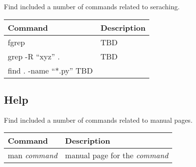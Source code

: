 Find included a number of commands related to seraching.

\begin{longtable}[]{@{}ll@{}}
\toprule
\begin{minipage}[b]{0.46\columnwidth}\raggedright\strut
Command\strut
\end{minipage} & \begin{minipage}[b]{0.21\columnwidth}\raggedright\strut
Description\strut
\end{minipage}\tabularnewline
\midrule
\endhead
\begin{minipage}[t]{0.46\columnwidth}\raggedright\strut
fgrep\strut
\end{minipage} & \begin{minipage}[t]{0.21\columnwidth}\raggedright\strut
TBD\strut
\end{minipage}\tabularnewline
\begin{minipage}[t]{0.46\columnwidth}\raggedright\strut
grep -R ``xyz'' .\strut
\end{minipage} & \begin{minipage}[t]{0.21\columnwidth}\raggedright\strut
TBD\strut
\end{minipage}\tabularnewline
\begin{minipage}[t]{0.48\columnwidth}\raggedright\strut
find . -name ``*.py'' \textbar{} TBD \textbar{}\strut
\end{minipage} & \begin{minipage}[t]{0.48\columnwidth}\raggedright\strut
\strut
\end{minipage}\tabularnewline
\bottomrule
\end{longtable}

\subsection{Help}\label{help}

Find included a number of commands related to manual pages.

\begin{longtable}[]{@{}ll@{}}
\toprule
\begin{minipage}[b]{0.24\columnwidth}\raggedright\strut
Command\strut
\end{minipage} & \begin{minipage}[b]{0.44\columnwidth}\raggedright\strut
Description\strut
\end{minipage}\tabularnewline
\midrule
\endhead
\begin{minipage}[t]{0.24\columnwidth}\raggedright\strut
man \emph{command}\strut
\end{minipage} & \begin{minipage}[t]{0.44\columnwidth}\raggedright\strut
manual page for the \emph{command}\strut
\end{minipage}\tabularnewline
\bottomrule
\end{longtable}

